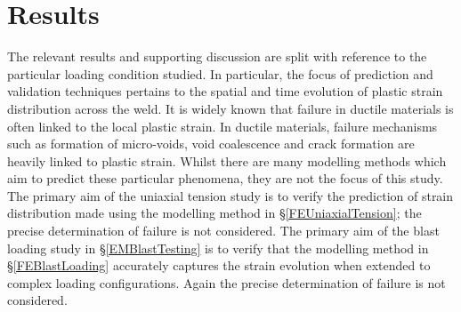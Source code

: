 \section{Results}
\label{Results}
The relevant results and supporting discussion are split with reference to the particular loading condition studied. In particular, the focus of prediction and validation techniques pertains to the spatial and time evolution of plastic strain distribution across the weld. It is widely known that failure in ductile materials is often linked to the local plastic strain. In ductile materials, failure mechanisms such as formation of micro-voids, void coalescence and crack formation are heavily linked to plastic strain. Whilst there are many modelling methods which aim to predict these particular phenomena, they are not the focus of this study. The primary aim of the uniaxial tension study is to verify the prediction of strain distribution made using the modelling method in \S\ref{FEUniaxialTension}; the precise determination of failure is not considered. The primary aim of the blast loading study in \S\ref{EMBlastTesting} is to verify that the modelling method in \S\ref{FEBlastLoading} accurately captures the strain evolution when extended to complex loading configurations. Again the precise determination of failure is not considered.
%
